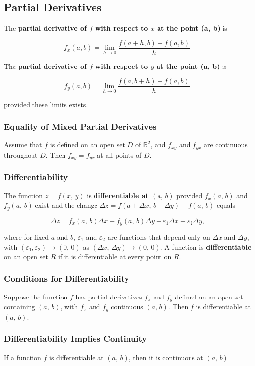 \subsection{Partial Derivatives}
The \textbf{partial derivative of $f$ with respect to $x$ at the point (a, b)} is

\begin{equation}
    f_x (a, b) = \lim _{h \rightarrow 0} \frac{f(a + h, b) - f(a, b)}{h}.
\end{equation}

The \textbf{partial derivative of $f$ with respect to $y$ at the point (a, b)} is

\begin{equation}
    f_y (a, b) = \lim _{h \rightarrow 0} \frac{f(a, b + h) - f(a, b)}{h}.
\end{equation}

provided these limits exists.

\subsubsection{Equality of Mixed Partial Derivatives}
Assume that $f$ is defined on an open set $D$ of $\mathbb{R}^2$, and $f_{xy}$ and $f_{yx}$ are continuous throughout $D$. Then $f_{xy} = f_{yx}$ at all points of $D$.

\subsubsection{Differentiability}
The function $z = f(x,\, y)$ is \textbf{differentiable at $(a,\, b)$} provided $f_x(a,\, b)$ and $f_y(a,\, b)$ exist and the change $\Delta z = f(a + \Delta x,\, b + \Delta y) - f(a,\, b)$ equals

\begin{equation}
     \Delta z = f_x (a,\, b) \Delta x + f_y (a,\, b) \Delta y + \varepsilon_1 \Delta x + \varepsilon_2 \Delta y,
\end{equation}

where for fixed $a$ and $b$, $\varepsilon_1$ and $\varepsilon_2$ are functions that depend only on $\Delta x$ and $\Delta y$, with $(\varepsilon_1, \varepsilon_2) \rightarrow (0,\, 0)$ as $(\Delta x,\, \Delta y) \rightarrow (0,\, 0)$. A function is \textbf{differentiable} on an open set $R$ if it is differentiable at every point on $R$.

\subsubsection{Conditions for Differentiability}
Suppose the function $f$ has partial derivatives $f_x$ and $f_y$ defined on an open set containing $(a,\, b)$, with $f_x$ and $f_y$ continuous $(a,\, b)$. Then $f$ is differentiable at $(a,\, b)$.

\subsubsection{Differentiability Implies Continuity}
If a function $f$ is differentiable at $(a,\, b)$, then it is continuous at $(a,\, b)$
